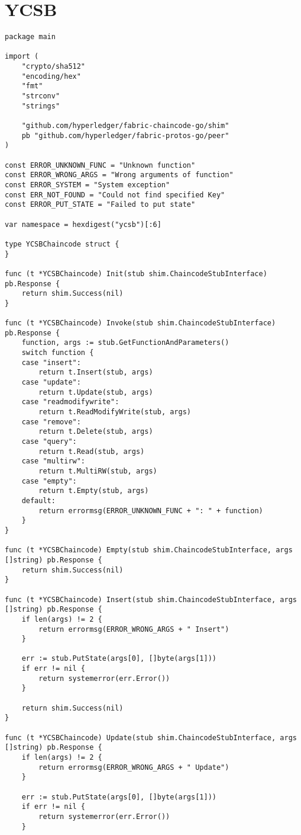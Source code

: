 \section{YCSB}
\label{sec:append:contracts:ycsb}
\begin{lstlisting}
package main

import (
	"crypto/sha512"
	"encoding/hex"
	"fmt"
	"strconv"
	"strings"

	"github.com/hyperledger/fabric-chaincode-go/shim"
    pb "github.com/hyperledger/fabric-protos-go/peer"
)

const ERROR_UNKNOWN_FUNC = "Unknown function"
const ERROR_WRONG_ARGS = "Wrong arguments of function"
const ERROR_SYSTEM = "System exception"
const ERR_NOT_FOUND = "Could not find specified Key"
const ERROR_PUT_STATE = "Failed to put state"

var namespace = hexdigest("ycsb")[:6]

type YCSBChaincode struct {
}

func (t *YCSBChaincode) Init(stub shim.ChaincodeStubInterface) pb.Response {
	return shim.Success(nil)
}

func (t *YCSBChaincode) Invoke(stub shim.ChaincodeStubInterface) pb.Response {
	function, args := stub.GetFunctionAndParameters()
	switch function {
	case "insert":
		return t.Insert(stub, args)
	case "update":
		return t.Update(stub, args)
	case "readmodifywrite":
		return t.ReadModifyWrite(stub, args)
	case "remove":
		return t.Delete(stub, args)
	case "query":
		return t.Read(stub, args)
	case "multirw":
		return t.MultiRW(stub, args)
	case "empty":
		return t.Empty(stub, args)
	default:
		return errormsg(ERROR_UNKNOWN_FUNC + ": " + function)
	}
}

func (t *YCSBChaincode) Empty(stub shim.ChaincodeStubInterface, args []string) pb.Response {
	return shim.Success(nil)
}

func (t *YCSBChaincode) Insert(stub shim.ChaincodeStubInterface, args []string) pb.Response {
	if len(args) != 2 { 
		return errormsg(ERROR_WRONG_ARGS + " Insert")
	}

	err := stub.PutState(args[0], []byte(args[1]))
	if err != nil {
		return systemerror(err.Error())
	}

	return shim.Success(nil)
}

func (t *YCSBChaincode) Update(stub shim.ChaincodeStubInterface, args []string) pb.Response {
	if len(args) != 2 { 
		return errormsg(ERROR_WRONG_ARGS + " Update")
	}

	err := stub.PutState(args[0], []byte(args[1]))
	if err != nil {
		return systemerror(err.Error())
	}


\end{lstlisting}
